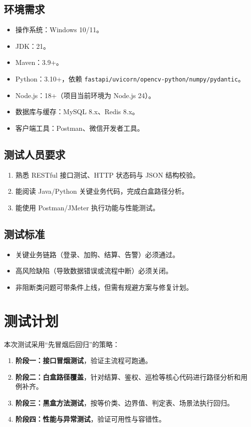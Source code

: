 \subsection{环境需求}
\begin{itemize}[leftmargin=2em]
  \item 操作系统：Windows 10/11。
  \item JDK：21。
  \item Maven：3.9+。
  \item Python：3.10+，依赖 \texttt{fastapi/uvicorn/opencv-python/numpy/pydantic}。
  \item Node.js：18+（项目当前环境为 Node.js 24）。
  \item 数据库与缓存：MySQL 8.x、Redis 8.x。
  \item 客户端工具：Postman、微信开发者工具。
\end{itemize}

\subsection{测试人员要求}
\begin{enumerate}[leftmargin=2em]
  \item 熟悉 RESTful 接口测试、HTTP 状态码与 JSON 结构校验。
  \item 能阅读 Java/Python 关键业务代码，完成白盒路径分析。
  \item 能使用 Postman/JMeter 执行功能与性能测试。
\end{enumerate}

\subsection{测试标准}
\begin{itemize}[leftmargin=2em]
  \item 关键业务链路（登录、加购、结算、告警）必须通过。
  \item 高风险缺陷（导致数据错误或流程中断）必须关闭。
  \item 非阻断类问题可带条件上线，但需有规避方案与修复计划。
\end{itemize}

\section{测试计划}

本次测试采用“先冒烟后回归”的策略：
\begin{enumerate}[leftmargin=2em]
  \item \textbf{阶段一：接口冒烟测试}，验证主流程可跑通。
  \item \textbf{阶段二：白盒路径覆盖}，针对结算、鉴权、巡检等核心代码进行路径分析和用例补齐。
  \item \textbf{阶段三：黑盒方法测试}，按等价类、边界值、判定表、场景法执行回归。
  \item \textbf{阶段四：性能与异常测试}，验证可用性与容错性。
\end{enumerate}

